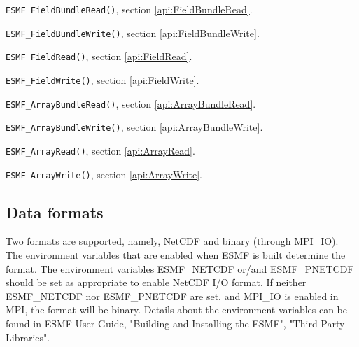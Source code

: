 \begin{description}
\item {\tt ESMF\_FieldBundleRead()}, section \ref{api:FieldBundleRead}.
\item {\tt ESMF\_FieldBundleWrite()}, section \ref{api:FieldBundleWrite}.
\item {\tt ESMF\_FieldRead()}, section \ref{api:FieldRead}.
\item {\tt ESMF\_FieldWrite()}, section \ref{api:FieldWrite}.
\item {\tt ESMF\_ArrayBundleRead()}, section \ref{api:ArrayBundleRead}.
\item {\tt ESMF\_ArrayBundleWrite()}, section \ref{api:ArrayBundleWrite}.
\item {\tt ESMF\_ArrayRead()}, section \ref{api:ArrayRead}.
\item {\tt ESMF\_ArrayWrite()}, section \ref{api:ArrayWrite}.
\end{description}


\subsection{Data formats}

Two formats are supported, namely, NetCDF and binary (through MPI\_IO). 
The environment variables that are enabled when ESMF is built determine the 
format.  The environment variables ESMF\_NETCDF or/and ESMF\_PNETCDF should be 
set as appropriate to enable NetCDF I/O format.  If neither ESMF\_NETCDF nor
ESMF\_PNETCDF are set, and MPI\_IO is enabled in MPI, the format will be 
binary.  Details about the environment variables can be found in ESMF User 
Guide, "Building and Installing the ESMF", "Third Party Libraries".

